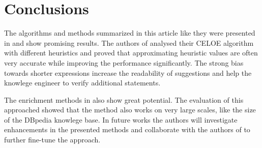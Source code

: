\section{Conclusions}
The algorithms and methods summarized in this article like they were presented
in \cite{paper1} and \cite{paper2} show promising results. The authors of
\cite{paper1} analysed their CELOE algorithm with different heuristics and
proved that approximating heuristic values are often very accurate while
improving the performance significantly. The strong bias towards shorter
expressions increase the readability of suggestions and help the knowlege
engineer to verify additional statements. 

The enrichment methods in \cite{paper2} also show great potential. The
evaluation of this approached showed that the method also works on very large
scales, like the size of the DBpedia knowlege base. In future works the authors
will investigate enhancements in the presented methods and collaborate with the
authors of \cite{31} to further fine-tune the approach.
